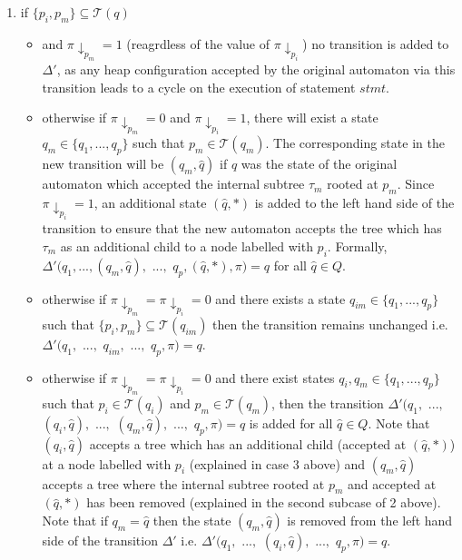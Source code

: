 \documentclass{llncs}
\begin{document}
\begin{enumerate}
\item if $\{p_i, p_m\} \subseteq \mathcal{T}(q)$
	\begin{itemize}
	\item and $\pi \downarrow_{p_m} = 1$ (reagrdless of the value of $\pi \downarrow_{p_i}$) no transition is added to $\Delta'$, as any heap configuration accepted by the original automaton via this transition leads to a cycle on the execution of statement $stmt$.
	\item otherwise if $\pi \downarrow_{p_m} = 0$ and $\pi \downarrow_{p_i} = 1$, there will exist a state $q_m \in \{q_1, ..., q_p\}$ such that $p_m \in \mathcal{T}(q_m)$. The corresponding state in the new transition will be $(q_m, \hat{q})$ if $\hat{q}$ was the state of the original automaton which accepted the internal subtree $\tau_m$ rooted at $p_m$. Since $\pi \downarrow_{p_i} = 1$, an additional state $(\hat{q}, *)$ is added to the left hand side of the transition to ensure that the new automaton accepts the tree which has $\tau_m$ as an additional child to a node labelled with $p_i$. Formally, $\Delta'(q_1, ..., (q_m, \hat{q}),$ $...,$ $q_p, (\hat{q},*), \pi) = q$ for all $\hat{q} \in Q$.

	\item otherwise if $\pi \downarrow_{p_m} = \pi \downarrow_{p_i} = 0$ and there exists a state $q_{im} \in \{q_1, ..., q_p\}$ such that $\{p_i, p_m\} \subseteq \mathcal{T}(q_{im})$ then the transition remains unchanged i.e. $\Delta'(q_1,$ $...,$ $q_{im},$ $...,$ $q_p, \pi) =  q$.

	\item otherwise if $\pi \downarrow_{p_m} = \pi \downarrow_{p_i} = 0$ and there exist states $q_i, q_m \in \{q_1, ..., q_p\}$ such that $p_i \in \mathcal{T}(q_i)$ and $p_m \in \mathcal{T}(q_m)$, then the transition   $\Delta'(q_1,$ $...,$ $(q_i,\hat{q}),$ $...,$ $(q_m,\hat{q}),$ $...,$ $q_p, \pi) = q$ is added for all $\hat{q} \in Q$. Note that $(q_i, \hat{q})$ accepts a tree which has an additional child (accepted at $(\hat{q},*)$) at a node labelled with $p_i$ (explained in case 3 above) and $(q_m, \hat{q})$ accepts a tree where the internal subtree rooted at $p_m$ and accepted at $(\hat{q},*)$ has been removed (explained in the second subcase of 2 above). Note that if $q_m = \hat{q}$ then the state $(q_m, \hat{q})$ is removed from the left hand side of the transition $\Delta'$ i.e. $\Delta'(q_1,$ $...,$ $(q_i,\hat{q}),$ $...,$ $q_p, \pi) = q$.
    	\end{itemize}

\end{enumerate}
\end{document}
